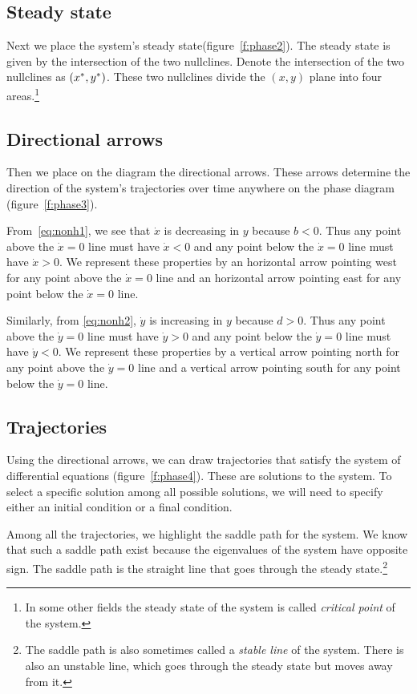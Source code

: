 \documentclass[letterpaper,12pt,leqno]{article}
\begin{document}
\subsection{Steady state}

Next we place the system's steady state(figure~\ref{f:phase2}). The steady state is given by the intersection of the two nullclines. Denote the intersection of the two nullclines as $\left( x^{*},y^{*} \right) $. These two nullclines divide the $(x,y)$ plane into four areas.\footnote{In some other fields the steady state of the system is called \textit{critical point} of the system.}

\subsection{Directional arrows}

Then we place on the diagram the directional arrows. These arrows determine the direction of the system's trajectories over time anywhere on the phase diagram (figure~\ref{f:phase3}). 

From~\eqref{eq:nonh1}, we see that $\dot{x}$ is decreasing in $y$ because $b<0$. Thus any point above the $\dot{x}=0$ line must have $\dot{x}<0$ and any point below the $\dot{x}=0$ line must have $\dot{x}>0$. We represent these properties by an horizontal arrow pointing west for any point above the $\dot{x}=0$ line and an horizontal arrow pointing east for any point below the $\dot{x}=0$ line. 

Similarly, from \eqref{eq:nonh2}, $\dot{y}$ is increasing in $y$ because $d>0$. Thus any point above the $\dot{y}=0$ line must have $\dot{y}>0$ and any point below the $\dot{y}=0$ line must have $\dot{y}<0$. We represent these properties by a vertical arrow pointing north for any point above the $\dot{y}=0$ line and a vertical arrow pointing south for any point below the $\dot{y}=0$ line. 


\subsection{Trajectories}

Using the directional arrows, we can draw trajectories that satisfy the system of differential equations (figure~\ref{f:phase4}). These are solutions to the system. To select a specific solution among all possible solutions, we will need to specify either an initial condition or a final condition.

Among all the trajectories, we highlight the saddle path for the system. We know that such a saddle path exist because the eigenvalues of the system have opposite sign. The saddle path is the straight line that goes through the steady state.\footnote{The saddle path is also sometimes called a \textit{stable line} of the system. There is also an unstable line, which goes through the steady state but moves away from it.}
\end{document}
